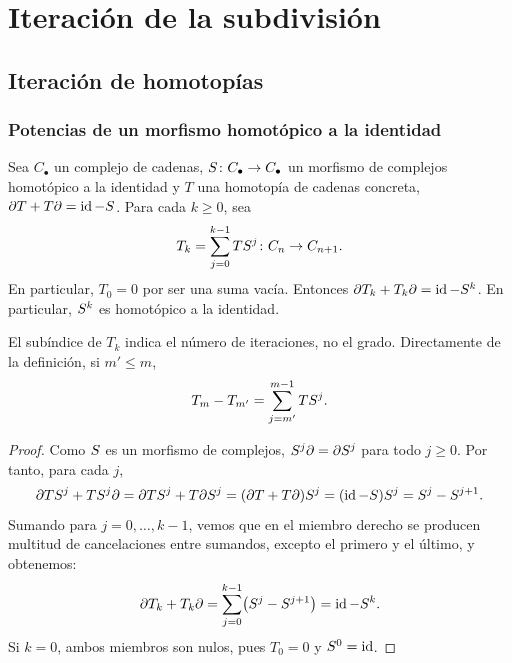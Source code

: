 \section{Iteración de la subdivisión}

\subsection{Iteración de homotopías}

\begin{frame}[allowframebreaks]
  \frametitle{Potencias de un morfismo homotópico a la identidad}

  \begin{lemma}
    Sea $C_\bullet$ un complejo de cadenas, $S\colon C_\bullet\to C_\bullet$ un morfismo de complejos homotópico a la identidad y $T$ una
    homotopía de cadenas concreta, $\partial T+T\partial=\operatorname{id}-S$. Para cada
    $k\geq0$, sea
    \[
      T_k=\sum_{j=0}^{k-1}TS^j\colon C_n\to C_{n+1}.
    \]
    En particular, $T_0=0$ por ser una suma vacía.
    Entonces $\partial T_k+T_k\partial=\operatorname{id}-S^k$. En particular, $S^k$
    es homotópico a la identidad.
  \end{lemma}

  El subíndice de $T_k$ indica el número de iteraciones, no el grado.
  Directamente de la definición, si $m'\leq m$,
  \[
    T_m-T_{m'}=\sum_{j=m'}^{m-1}TS^j.
  \]

  \framebreak

  \begin{proof}
    Como $S$ es un morfismo de complejos, $S^j\partial=\partial S^j$
    para todo $j\geq0$. Por tanto, para cada $j$,
    \[
      \partial TS^j+TS^j\partial
      =\partial TS^j+T\partial S^j
      =(\partial T+T\partial)S^j
      =(\operatorname{id}-S)S^j
      =S^j-S^{j+1}.
    \]
    Sumando para $j=0,\ldots,k-1$, vemos que en el miembro derecho se producen multitud de cancelaciones entre sumandos, excepto el primero y el último, y obtenemos:
    \[
      \partial T_k+T_k\partial
      =\sum_{j=0}^{k-1}\bigl(S^j-S^{j+1}\bigr)
      =\operatorname{id}-S^k.
    \]
    Si $k=0$, ambos miembros son nulos, pues $T_0=0$ y $S^0=\operatorname{id}$.
  \end{proof}
\end{frame}
